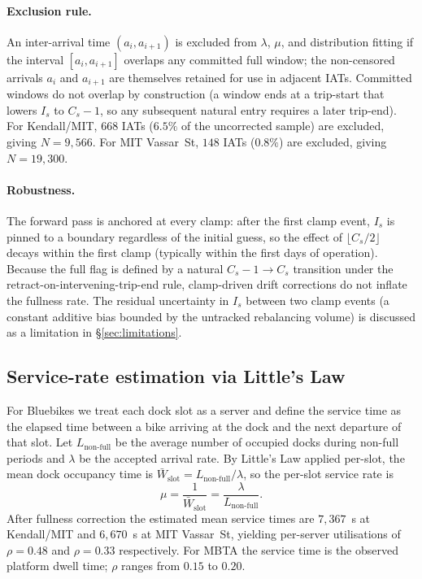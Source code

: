 \paragraph{Exclusion rule.} An inter-arrival time $(a_i, a_{i+1})$ is excluded from $\lambda$, $\mu$, and distribution fitting if the interval $[a_i, a_{i+1}]$ overlaps any committed full window; the non-censored arrivals $a_i$ and $a_{i+1}$ are themselves retained for use in adjacent IATs. Committed windows do not overlap by construction (a window ends at a trip-start that lowers $I_s$ to $C_s-1$, so any subsequent natural entry requires a later trip-end). For Kendall/MIT, $668$ IATs ($6.5\%$ of the uncorrected sample) are excluded, giving $N = 9{,}566$. For MIT Vassar~St, $148$ IATs ($0.8\%$) are excluded, giving $N = 19{,}300$.

\paragraph{Robustness.} The forward pass is anchored at every clamp: after the first clamp event, $I_s$ is pinned to a boundary regardless of the initial guess, so the effect of $\lfloor C_s/2 \rfloor$ decays within the first clamp (typically within the first days of operation). Because the full flag is defined by a natural $C_s-1 \to C_s$ transition under the retract-on-intervening-trip-end rule, clamp-driven drift corrections do not inflate the fullness rate. The residual uncertainty in $I_s$ between two clamp events (a constant additive bias bounded by the untracked rebalancing volume) is discussed as a limitation in \S\ref{sec:limitations}.

\subsection{Service-rate estimation via Little's Law}\label{app:service-rate}

For Bluebikes we treat each dock slot as a server and define the service time as the elapsed time between a bike arriving at the dock and the next departure of that slot. Let $L_{\text{non-full}}$ be the average number of occupied docks during non-full periods and $\lambda$ be the accepted arrival rate. By Little's Law applied per-slot, the mean dock occupancy time is $\bar{W}_{\text{slot}} = L_{\text{non-full}}/\lambda$, so the per-slot service rate is
\[
\mu = \frac{1}{\bar{W}_{\text{slot}}} = \frac{\lambda}{L_{\text{non-full}}}.
\]
After fullness correction the estimated mean service times are $7{,}367$~s at Kendall/MIT and $6{,}670$~s at MIT Vassar~St, yielding per-server utilisations of $\rho = 0.48$ and $\rho = 0.33$ respectively. For MBTA the service time is the observed platform dwell time; $\rho$ ranges from $0.15$ to $0.20$.

